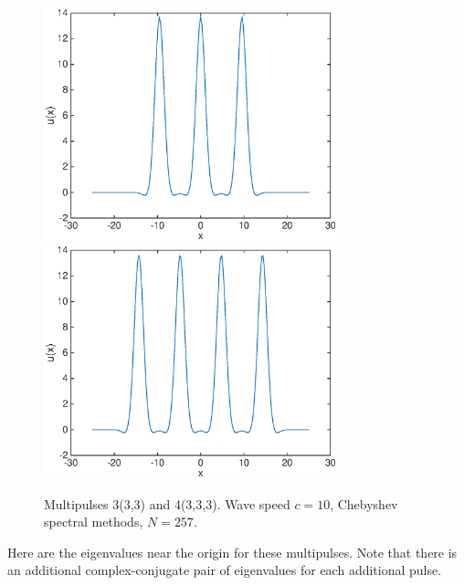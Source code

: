 \documentclass[12pt]{article}
\begin{document}
\begin{figure}[H]
	\includegraphics[width=8.5cm]{cheb10um2_3.eps}
	\includegraphics[width=8.5cm]{cheb10um2_4.eps}
	\caption{Multipulses 3(3,3) and 4(3,3,3). Wave speed $c = 10$, Chebyshev spectral methods, $N = 257$.}
\end{figure}

Here are the eigenvalues near the origin for these multipulses. Note that there is an additional complex-conjugate pair of eigenvalues for each additional pulse.
\end{document}
